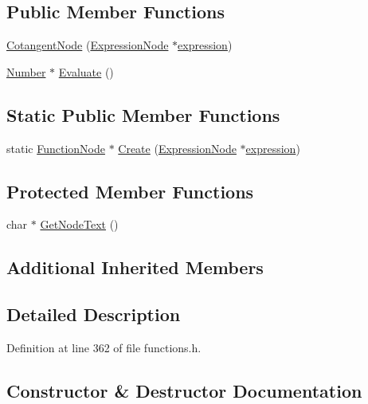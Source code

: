 \subsection*{Public Member Functions}
\begin{DoxyCompactItemize}
\item 
\hyperlink{classCotangentNode_a3457b70c27b59112caa8dea6f9b167d9}{Cotangent\+Node} (\hyperlink{classExpressionNode}{Expression\+Node} $\ast$\hyperlink{classFunctionNode_ad7577b179a1937aaf8a0058bb5b546dc}{expression})
\item 
\hyperlink{structNumber}{Number} $\ast$ \hyperlink{classCotangentNode_a54c895e0369c2b738f12c0534d7d5aa4}{Evaluate} ()
\end{DoxyCompactItemize}
\subsection*{Static Public Member Functions}
\begin{DoxyCompactItemize}
\item 
static \hyperlink{classFunctionNode}{Function\+Node} $\ast$ \hyperlink{classCotangentNode_ac9791f0fe778d4fcbab071a73186e1b0}{Create} (\hyperlink{classExpressionNode}{Expression\+Node} $\ast$\hyperlink{classFunctionNode_ad7577b179a1937aaf8a0058bb5b546dc}{expression})
\end{DoxyCompactItemize}
\subsection*{Protected Member Functions}
\begin{DoxyCompactItemize}
\item 
char $\ast$ \hyperlink{classCotangentNode_acd6fcd18119427e516389403d3a3c1f7}{Get\+Node\+Text} ()
\end{DoxyCompactItemize}
\subsection*{Additional Inherited Members}


\subsection{Detailed Description}


Definition at line 362 of file functions.\+h.



\subsection{Constructor \& Destructor Documentation}

